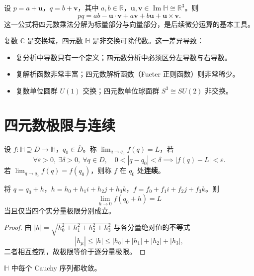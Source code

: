 \begin{remark}[四元数乘积公式的向量形式]\label{rem:q_product_vector_form}
设 $p=a+\mathbf{u}$，$q=b+\mathbf{v}$，其中 $a,b\in\mathbb{R}$，$\mathbf{u},\mathbf{v}\in\operatorname{Im}\mathbb{H}\cong\mathbb{R}^3$。则
\[
pq=ab-\mathbf{u}\cdot\mathbf{v}+a\mathbf{v}+b\mathbf{u}+\mathbf{u}\times\mathbf{v}.
\]
这一公式将四元数乘法分解为标量部分与向量部分，是后续微分运算的基本工具。
\end{remark}

\begin{remark}[与复数代数的对比]\label{rem:q_vs_complex}
复数 $\mathbb{C}$ 是交换域，四元数 $\mathbb{H}$ 是非交换可除代数。这一差异导致：
\begin{itemize}
    \item 复分析中导数只有一个定义；四元数分析中必须区分左导数与右导数。
    \item 复解析函数非常丰富；四元数解析函数（Fueter 正则函数）则非常稀少。
    \item 复数单位圆群 $U(1)$ 交换；四元数单位球面群 $S^3\cong SU(2)$ 非交换。
\end{itemize}
\end{remark}

\section{四元数极限与连续}

\begin{definition}[四元数极限]\label{def:q_limit}
设 $f:\mathbb{H}\supseteq D\to\mathbb{H}$，$q_0\in\overline{D}$。称 $\lim_{q\to q_0}f(q)=L$，若
\[
\forall \varepsilon>0,\ \exists \delta>0,\ \forall q\in D,\quad 0<|q-q_0|<\delta\implies |f(q)-L|<\varepsilon.
\]
若 $\lim_{q\to q_0}f(q)=f(q_0)$，则称 $f$ 在 $q_0$ 处\textbf{连续}。
\end{definition}

\begin{proposition}[极限的坐标刻画]\label{prop:q_limit_coordinate}
将 $q=q_0+h$，$h=h_0+h_1i+h_2j+h_3k$，$f=f_0+f_1i+f_2j+f_3k$。则
\[
\lim_{h\to 0}f(q_0+h)=L
\]
当且仅当四个实分量极限分别成立。
\end{proposition}

\begin{proof}
由 $|h|=\sqrt{h_0^2+h_1^2+h_2^2+h_3^2}$ 与各分量绝对值的不等式
\[
|h_\mu|\le |h|\le |h_0|+|h_1|+|h_2|+|h_3|,
\]
二者相互控制，故极限等价于逐分量极限。
\end{proof}

\begin{theorem}\label{thm:q_completeness}
$\mathbb{H}$ 中每个 Cauchy 序列都收敛。
\end{theorem}

